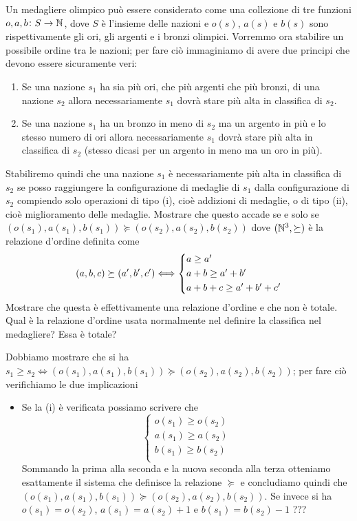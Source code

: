 \documentclass[a4paper]{article}\par \usepackage{style}\par
\begin{document}
\begin{es}
  Un medagliere olimpico può essere considerato come una collezione di tre funzioni $ o, a, b \colon S \to \mathbb{N} $, dove $ S $ è l'insieme delle nazioni e $ o(s) $, $ a(s) $ e $ b(s) $ sono rispettivamente gli ori, gli argenti e i bronzi olimpici. Vorremmo ora stabilire un possibile ordine tra le nazioni; per fare ciò immaginiamo di avere due principi che devono essere sicuramente veri:
  \begin{enumerate}[label=(\roman*)]
  \item Se una nazione $ s_1 $ ha sia più ori, che più argenti che più bronzi, di una nazione $ s_2 $ allora necessariamente $ s_1 $ dovrà stare più alta in classifica di $ s_2 $.
  \item Se una nazione $ s_1 $ ha un bronzo in meno di $ s_2 $ ma un argento in più e lo stesso numero di ori allora necessariamente $ s_1 $ dovrà stare più alta in classifica di $ s_2 $ (stesso dicasi per un argento in meno ma un oro in più).
  \end{enumerate}
  Stabiliremo quindi che una nazione $ s_1 $ è necessariamente più alta in classifica di $ s_2 $ se posso raggiungere la configurazione di medaglie di $ s_1 $ dalla configurazione di $ s_2 $ compiendo solo operazioni di tipo (i), cioè addizioni di medaglie, o di tipo (ii), cioè miglioramento delle medaglie. Mostrare che questo accade se e solo se $ (o(s_1), a(s_1), b(s_1)) \succeq (o(s_2), a(s_2), b(s_2)) $ dove $ (\mathbb{N}^3, \succeq) $ è la relazione d'ordine definita come
  \[(a, b, c) \succeq (a', b', c') \liff
    \begin{cases*}
      a \geq a' \\
      a + b \geq a' + b' \\
      a + b + c \geq a' + b' + c' \\
    \end{cases*}\]
  Mostrare che questa è effettivamente una relazione d'ordine e che non è totale. Qual è la relazione d'ordine usata normalmente nel definire la classifica nel medagliere? Essa è totale?
\end{es}
Dobbiamo mostrare che si ha $ s_1 \geq s_2 \iff (o(s_1), a(s_1), b(s_1)) \succeq (o(s_2), a(s_2), b(s_2)) $; per fare ciò verifichiamo le due implicazioni
\begin{itemize}[label=$ \Rightarrow $]
\item Se la (i) è verificata possiamo scrivere che
  \[\begin{cases*}
      o(s_1) \geq o(s_2) \\
      a(s_1) \geq a(s_2) \\
      b(s_1) \geq b(s_2) \\
    \end{cases*}\]
  Sommando la prima alla seconda e la nuova seconda alla terza otteniamo esattamente il sistema che definisce la relazione $ \succeq $ e concludiamo quindi che $ (o(s_1), a(s_1), b(s_1)) \succeq (o(s_2), a(s_2), b(s_2)) $. Se invece si ha $ o(s_1) = o(s_2) $, $ a(s_1) = a(s_2) + 1 $ e $ b(s_1) = b(s_2) - 1 $ ???
\end{itemize}
\end{document}
